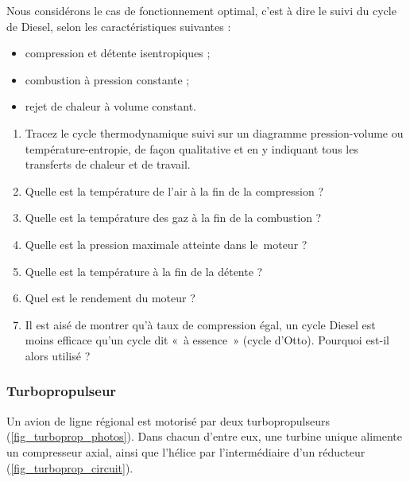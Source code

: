 \begin{figure}
\begin{center}
		\end{center}
		\label{fig_photos_moteur_diesel}
	\end{figure}

	Nous considérons le cas de fonctionnement optimal, c’est à dire le suivi du cycle de Diesel, selon les caractéristiques suivantes :
	\begin{itemize}
		\item compression et détente isentropiques ;
		\item combustion à pression constante ;
		\item rejet de chaleur à volume constant.
	\end{itemize}
	
	\begin{enumerate}
		\item Tracez le cycle thermodynamique suivi sur un diagramme pression-volume ou température-entropie, de façon qualitative et en y indiquant tous les transferts de chaleur et de travail.
		\item Quelle est la température de l’air à la fin de la compression ?
		\item Quelle est la température des gaz à la fin de la combustion ?
		\item Quelle est la pression maximale atteinte dans le~\mbox{moteur} ?
		\item Quelle est la température à la fin de la détente ?
		\item Quel est le rendement du moteur ?
		\item Il est aisé de montrer qu’à taux de compression égal, un cycle Diesel est moins efficace qu’un cycle dit «~à essence~» (cycle d’Otto). Pourquoi est-il alors utilisé ?
	\end{enumerate}


\subsubsection{Turbopropulseur}
\label{exo_cycle_turbopropulseur}
	
	Un avion de ligne régional est motorisé par deux turbopropulseurs (\cref{fig_turboprop_photos}). Dans chacun d’entre eux, une turbine unique alimente un compresseur axial, ainsi que l’hélice par l’intermédiaire d’un réducteur (\cref{fig_turboprop_circuit}).
	
